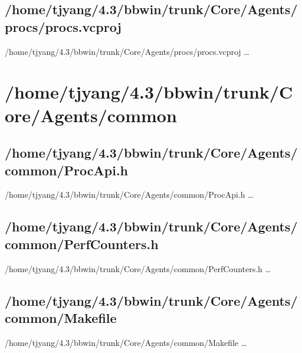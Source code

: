 \subsection{/home/tjyang/4.3/bbwin/trunk/Core/Agents/procs/procs.vcproj}
\lstset{numberstyle=\tiny,numbers=left,
   breaklines=true,
   stepnumber=1,numbersep=5pt,firstnumber=1,
   xleftmargin=12pt,showstringspaces=false}
\noindent /home/tjyang/4.3/bbwin/trunk/Core/Agents/procs/procs.vcproj  \ldots



\section{/home/tjyang/4.3/bbwin/trunk/Core/Agents/common}


\subsection{/home/tjyang/4.3/bbwin/trunk/Core/Agents/common/ProcApi.h}
\lstset{numberstyle=\tiny,numbers=left,
   breaklines=true,
   stepnumber=1,numbersep=5pt,firstnumber=1,
   xleftmargin=12pt,showstringspaces=false}
\noindent /home/tjyang/4.3/bbwin/trunk/Core/Agents/common/ProcApi.h  \ldots



\subsection{/home/tjyang/4.3/bbwin/trunk/Core/Agents/common/PerfCounters.h}
\lstset{numberstyle=\tiny,numbers=left,
   breaklines=true,
   stepnumber=1,numbersep=5pt,firstnumber=1,
   xleftmargin=12pt,showstringspaces=false}
\noindent /home/tjyang/4.3/bbwin/trunk/Core/Agents/common/PerfCounters.h  \ldots



\subsection{/home/tjyang/4.3/bbwin/trunk/Core/Agents/common/Makefile}
\lstset{numberstyle=\tiny,numbers=left,
   breaklines=true,
   stepnumber=1,numbersep=5pt,firstnumber=1,
   xleftmargin=12pt,showstringspaces=false}
\noindent /home/tjyang/4.3/bbwin/trunk/Core/Agents/common/Makefile  \ldots



